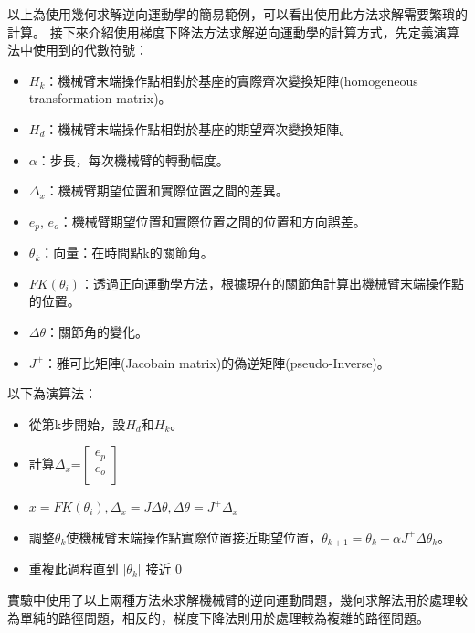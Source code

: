 \documentclass[class=NCU_thesis, crop=false]{standalone}
\begin{document}
以上為使用幾何求解逆向運動學的簡易範例，可以看出使用此方法求解需要繁瑣的計算。
接下來介紹使用梯度下降法方法求解逆向運動學的計算方式，先定義演算法中使用到的代數符號：

\begin{itemize}
    \item $H_k$：機械臂末端操作點相對於基座的實際齊次變換矩陣(homogeneous transformation matrix)。
    \item $H_d$：機械臂末端操作點相對於基座的期望齊次變換矩陣。
    \item $\alpha$：步長，每次機械臂的轉動幅度。
    \item $\Delta_x$：機械臂期望位置和實際位置之間的差異。
    \item $e_p$, $e_o$：機械臂期望位置和實際位置之間的位置和方向誤差。
    \item $\theta_k$：向量：在時間點k的關節角。
    \item $FK\left(\theta_i\right)$：透過正向運動學方法，根據現在的關節角計算出機械臂末端操作點的位置。
    \item $\Delta \theta$：關節角的變化。
    \item $J^{+}$：雅可比矩陣(Jacobain matrix)的偽逆矩陣(pseudo-Inverse)。
\end{itemize}
以下為演算法：
\begin{itemize}
    \item 從第k步開始，設$H_d$和$H_k$。
    \item 計算$\Delta_x$=$\left[\begin{array}{c} e_p \\ e_o \\ \end{array}\right]$
    \item $x = FK\left(\theta_i\right), \Delta_x = J \Delta \theta, \Delta \theta = J^{+} \Delta_x$

    \item 調整$\theta_k$使機械臂末端操作點實際位置接近期望位置，$\theta_{k+1} = \theta_{k}+\alpha J^{+} \Delta \theta_k$。
    \item 重複此過程直到 $|\theta_k|$ 接近 0
\end{itemize}

實驗中使用了以上兩種方法來求解機械臂的逆向運動問題，幾何求解法用於處理較為單純的路徑問題，相反的，梯度下降法則用於處理較為複雜的路徑問題。

\end{document}
